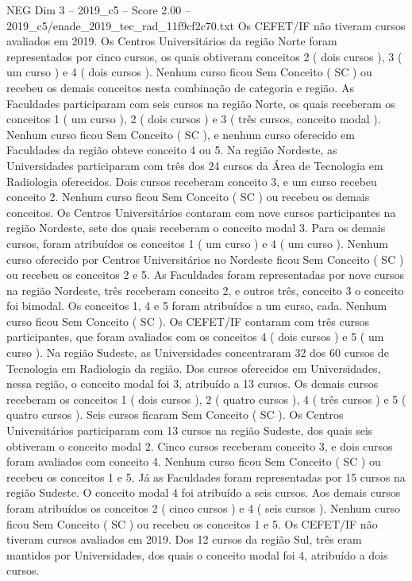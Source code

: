 \begin{textsample}{NEG Dim 3 – 2019\_c5 – Score 2.00 – 2019\_c5/enade\_2019\_tec\_rad\_11f9cf2c70.txt}
Os CEFET/IF não tiveram cursos avaliados em 2019.
Os Centros Universitários da região Norte foram representados por cinco cursos, os quais obtiveram conceitos 2 ( dois cursos ), 3 ( um curso ) e 4 ( dois cursos ).
Nenhum curso ficou Sem Conceito ( SC ) ou recebeu os demais conceitos nesta combinação de categoria e região.
As Faculdades participaram com seis cursos na região Norte, os quais receberam os conceitos 1 ( um curso ), 2 ( dois cursos ) e 3 ( três cursos, conceito modal ).
Nenhum curso ficou Sem Conceito ( SC ), e nenhum curso oferecido em Faculdades da região obteve conceito 4 ou 5.
Na região Nordeste, as Universidades participaram com três dos 24 cursos da Área de Tecnologia em Radiologia oferecidos.
Dois cursos receberam conceito 3, e um curso recebeu conceito 2.
Nenhum curso ficou Sem Conceito ( SC ) ou recebeu os demais conceitos.
Os Centros Universitários contaram com nove cursos participantes na região Nordeste, sete dos quais receberam o conceito modal 3.
Para os demais cursos, foram atribuídos os conceitos 1 ( um curso ) e 4 ( um curso ).
Nenhum curso oferecido por Centros Universitários no Nordeste ficou Sem Conceito ( SC ) ou recebeu os conceitos 2 e 5.
As Faculdades foram representadas por nove cursos na região Nordeste, três receberam conceito 2, e outros três, conceito 3 o conceito foi bimodal.
Os conceitos 1, 4 e 5 foram atribuídos a um curso, cada.
Nenhum curso ficou Sem Conceito ( SC ).
Os CEFET/IF contaram com três cursos participantes, que foram avaliados com os conceitos 4 ( dois cursos ) e 5 ( um curso ).
Na região Sudeste, as Universidades concentraram 32 dos 60 cursos de Tecnologia em Radiologia da região.
Dos cursos oferecidos em Universidades, nessa região, o conceito modal foi 3, atribuído a 13 cursos.
Os demais cursos receberam os conceitos 1 ( dois cursos ), 2 ( quatro cursos ), 4 ( três cursos ) e 5 ( quatro cursos ).
Seis cursos ficaram Sem Conceito ( SC ).
Os Centros Universitários participaram com 13 cursos na região Sudeste, dos quais seis obtiveram o conceito modal 2.
Cinco cursos receberam conceito 3, e dois cursos foram avaliados com conceito 4.
Nenhum curso ficou Sem Conceito ( SC ) ou recebeu os conceitos 1 e 5.
Já as Faculdades foram representadas por 15 cursos na região Sudeste.
O conceito modal 4 foi atribuído a seis cursos.
Aos demais cursos foram atribuídos os conceitos 2 ( cinco cursos ) e 4 ( seis cursos ).
Nenhum curso ficou Sem Conceito ( SC ) ou recebeu os conceitos 1 e 5.
Os CEFET/IF não tiveram cursos avaliados em 2019.
Dos 12 cursos da região Sul, três eram mantidos por Universidades, dos quais o conceito modal foi 4, atribuído a dois cursos.

\end{textsample}
